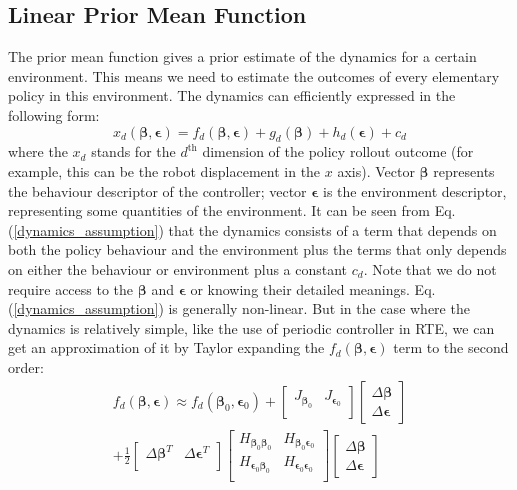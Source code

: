 \documentclass[journal]{IEEEtran}
\begin{document}
\subsection{Linear Prior Mean Function}
The prior mean function gives a prior estimate of the dynamics for a certain environment.
This means we need to estimate the outcomes of every elementary policy in this environment.
The dynamics can efficiently expressed in the following form:
\begin{equation}
x_d(\bm{\beta}, \bm{\epsilon}) = f_d(\bm{\beta}, \bm{\epsilon}) 
+ g_d(\bm{\beta}) 
+ h_d(\bm{\epsilon}) + c_d
\label{dynamics_assumption}
\end{equation}
where the $x_d$ stands for the $d^{\text{th}}$ dimension of the policy rollout outcome (for example, this can be the robot displacement in the $x$ axis). Vector $\bm{\beta}$ represents the behaviour descriptor of the controller; vector $\bm{\epsilon}$ is the environment descriptor, representing some quantities of the environment. 
It can be seen from Eq. (\ref{dynamics_assumption}) that the dynamics consists of a term that depends on both the policy behaviour and the environment plus the terms that only depends on either the behaviour or environment plus a constant $c_d$.
Note that we do not require access to the $\bm{\beta}$ and $\bm{\epsilon}$ or knowing their detailed meanings.
Eq. (\ref{dynamics_assumption}) is generally non-linear. But in the case where the dynamics is relatively simple, like the use of periodic controller in RTE, we can get an approximation of it by Taylor expanding the $f_d(\bm{\beta}, \bm{\epsilon})$ term to the second order:
\begin{equation}
\begin{gathered}
f_d(\bm{\beta}, \bm{\epsilon}) \approx
f_d(\bm{\beta}_0, \bm{\epsilon}_0) + 
\begin{bmatrix}
J_{\bm{\beta}_0} & J_{\bm{\epsilon}_0} \\
\end{bmatrix}
%
\begin{bmatrix}
\Delta \bm{\beta} \\
\Delta \bm{\epsilon}
\end{bmatrix}
%
\\
%
+ \frac{1}{2}
\begin{bmatrix}
\Delta \bm{\beta}^T & \Delta \bm{\epsilon}^T \\
\end{bmatrix}
%
\begin{bmatrix}
H_{\bm{\beta}_0 \bm{\beta}_0} & H_{\bm{\beta}_0 \bm{\epsilon}_0} \\
H_{\bm{\epsilon}_0 \bm{\beta}_0} & H_{\bm{\epsilon}_0 \bm{\epsilon}_0} \\
\end{bmatrix}
%
\begin{bmatrix}
\Delta \bm{\beta} \\
\Delta \bm{\epsilon}
\end{bmatrix}
\end{gathered}
\label{Taylor_expansion}
\end{equation}
\end{document}
